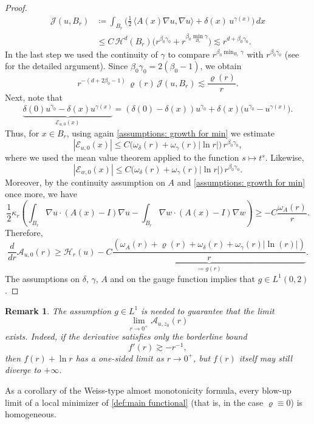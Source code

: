 \documentclass[reqno,11pt]{amsart}
\newtheorem{remark}{Remark}[section]
\newcommand{\1}{\mathds{1}}  %
\numberwithin{equation}{section}
\begin{document}
\begin{proof}
\begin{align*}
\mathcal{J}(u,B_r)
&\coloneqq \int_{B_r}\bigg(\frac12\,\langle A(x)\nabla u,\nabla u\rangle + \delta(x)\,u^{\gamma(x)}\bigg)\,dx \\
&\le C\,\mathcal{H}^d(B_r)\bigl(r^{\beta_0\gamma_0}+r^{\beta_0\min_{B_r}\gamma}\bigr)
\lesssim r^{d+\beta_0\gamma_0}.
\end{align*}
In the last step we used the continuity of $\gamma$ to compare $r^{\beta_0\min_{B_r}\gamma}$ with
$r^{\beta_0\gamma_0}$ (see \cite[Proof of Theorem 4.1]{ASTU1} for the detailed argument). Since
$\beta_0\gamma_0=2(\beta_0-1)$, we obtain
\[
    r^{-(d+2\beta_0-1)}\,\varrho(r)\,\mathcal{J}(u,B_r)\lesssim \frac{\varrho(r)}{r}.
\]
Next, note that
\[
    \underbrace{\delta(0)u^{\gamma_0}-\delta(x)u^{\gamma(x)}}_{\mathcal{E}_{u,0}(x)}
    = (\delta(0)-\delta(x))u^{\gamma_0} + \delta(x)\bigl(u^{\gamma_0}-u^{\gamma(x)}\bigr).
\]
Thus, for $x\in B_r$, using again \eqref{assumptions: growth for min} we estimate
\[
    |\mathcal{E}_{u,0}(x)| \le C\bigl(\omega_\delta(r)+\omega_\gamma(r)|\ln r|\bigr)\,r^{\beta_0\gamma_0},
\]
where we used the mean value theorem applied to the function $s \mapsto t^s$. Likewise,
\[
    |\mathcal{E}_{w,0}(x)| \le C\bigl(\omega_\delta(r)+\omega_\gamma(r)|\ln r|\bigr)\,r^{\beta_0\gamma_0}.
\]
Moreover, by the continuity assumption on $A$ and \eqref{assumptions: growth for min} once more, we have
\[
	\frac{1}{2}\kappa_r \left(\int_{B_r} \nabla u \cdot (A(x) - I)\nabla u - \int_{B_r} \nabla w \cdot (A(x) - I)\nabla w\right) \geq -C \frac{\omega_{A}(r)}{r}.
\]
Therefore,
\[
    \frac{d}{dr} \mathcal{A}_{u,0}(r) \geq \mathcal{H}_r(u) - C\underbrace{\frac{\left(\omega_A(r) + \varrho(r) + \omega_\delta(r) + \omega_\gamma(r)|\ln(r)|\right)}{r}}_{\coloneqq g(r)}.
\]
The assumptions on $\delta$, $\gamma$, $A$ and on the gauge function implies that $g \in L^1(0,2)$.
\end{proof}

\begin{remark}
The assumption $g\in L^1$ is needed to guarantee that the limit
\[
    \lim_{r\to 0^+}\mathcal{A}_{u,z_0}(r)
\]
exists. Indeed, if the derivative satisfies only the borderline bound
\[
    f'(r)\gtrsim -r^{-1},
\]
then $f(r)+\ln r$ has a one-sided limit as $r\to 0^+$, but $f(r)$ itself may still diverge to $+\infty$.
\end{remark}

As a corollary of the Weiss-type almost monotonicity formula, every blow-up limit of a local minimizer of \eqref{def:main functional} (that is, in the case $\varrho\equiv 0$) is homogeneous.
\end{document}

